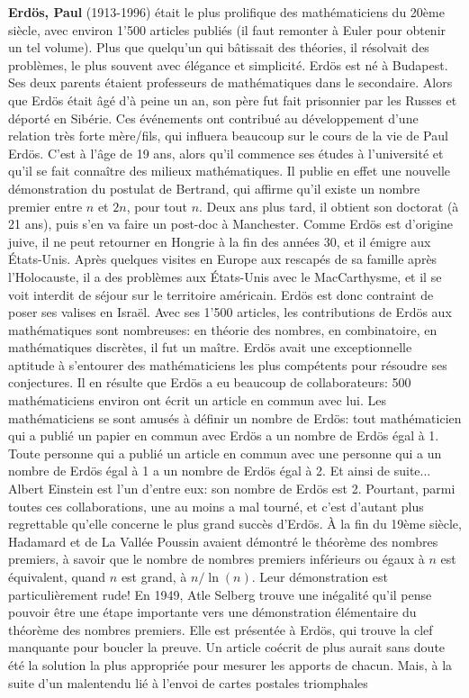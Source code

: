 \textbf{Erdös, Paul} (1913-1996) était le plus prolifique des mathématiciens du 20ème siècle, avec environ 1'500 articles publiés (il faut remonter à Euler pour obtenir un tel volume). Plus que quelqu'un qui bâtissait des théories, il résolvait des problèmes, le plus souvent avec élégance et simplicité. Erdös est né à Budapest. Ses deux parents étaient professeurs de mathématiques dans le secondaire. Alors que Erdös était âgé d'à peine un an, son père fut fait prisonnier par les Russes et déporté en Sibérie. Ces événements ont contribué au développement d'une relation très forte mère/fils, qui influera beaucoup sur le cours de la vie de Paul Erdös. C'est à l'âge de 19 ans, alors qu'il commence ses études à l'université et qu'il se fait connaître des milieux mathématiques. Il publie en effet une nouvelle démonstration du postulat de Bertrand, qui affirme qu'il existe un nombre premier entre $n$ et $2n$, pour tout $n$. Deux ans plus tard, il obtient son doctorat (à 21 ans), puis s'en va faire un post-doc à Manchester. Comme Erdös est d'origine juive, il ne peut retourner en Hongrie à la fin des années 30, et il émigre aux États-Unis. Après quelques visites en Europe aux rescapés de sa famille après l'Holocauste, il a des problèmes aux États-Unis avec le MacCarthysme, et il se voit interdit de séjour sur le territoire américain. Erdös est donc contraint de poser ses valises en Israël. Avec ses 1'500 articles, les contributions de Erdös aux mathématiques sont nombreuses: en théorie des nombres, en combinatoire, en mathématiques discrètes, il fut un maître. Erdös avait une exceptionnelle aptitude à s'entourer des mathématiciens les plus compétents pour résoudre ses conjectures. Il en résulte que Erdös a eu beaucoup de collaborateurs: 500 mathématiciens environ ont écrit un article en commun avec lui. Les mathématiciens se sont amusés à définir un nombre de Erdös: tout mathématicien qui a publié un papier en commun avec Erdös a un nombre de Erdös égal à 1. Toute personne qui a publié un article en commun avec une personne qui a un nombre de Erdös égal à 1 a un nombre de Erdös égal à 2. Et ainsi de suite... Albert Einstein est l'un d'entre eux: son nombre de Erdös est 2.  Pourtant, parmi toutes ces collaborations, une au moins a mal tourné, et c'est d'autant plus regrettable qu'elle concerne le plus grand succès d'Erdös. À la fin du 19ème siècle, Hadamard et de La Vallée Poussin avaient démontré le théorème des nombres premiers, à savoir que le nombre de nombres premiers inférieurs ou égaux à $n$ est équivalent, quand $n$ est grand, à $n/\ln(n)$. Leur démonstration est particulièrement rude! En 1949, Atle Selberg trouve une inégalité qu'il pense pouvoir être une étape importante vers une démonstration élémentaire du théorème des nombres premiers. Elle est présentée à Erdös, qui trouve la clef manquante pour boucler la preuve. Un article coécrit de plus aurait sans doute été la solution la plus appropriée pour mesurer les apports de chacun. Mais, à la suite d'un malentendu lié à l'envoi de cartes postales triomphales 